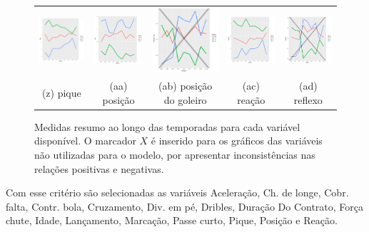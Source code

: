 \documentclass[review]{elsarticle}
\begin{document}
\begin{figure}
\begin{tabular}{ccccc}
    \includegraphics[width=25mm]{pique_result}  & \includegraphics[width=25mm]{pos_result} & \includegraphics[width=25mm]{posicion_gl_result} &     \includegraphics[width=25mm]{reacao_result}&
  \includegraphics[width=25mm]{reflexos_result}     \\
 \scriptsize{(z) pique} & \scriptsize{(aa) posição}& \scriptsize{(ab) posição do goleiro} & \scriptsize{(ac) reação} & \scriptsize{(ad) reflexo}  \\[3pt]

\end{tabular}
    \caption[\scriptsize{Medidas resumo.}]{\scriptsize{Medidas resumo ao longo das temporadas para cada variável disponível. O marcador $X$ é inserido para os gráficos das variáveis não utilizadas para o modelo, por apresentar inconsistências nas relações positivas e negativas.}}
        \label{fig:medresumo}
\end{figure}


Com esse critério são selecionadas as variáveis Aceleração, Ch. de longe, Cobr. falta, Contr. bola, Cruzamento, Div. em pé, Dribles, Duração Do Contrato, Força chute, Idade, Lançamento, Marcação, Passe curto, Pique, Posição e Reação.
\end{document}
